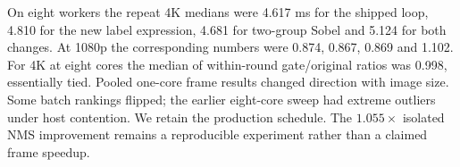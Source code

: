 On eight workers the repeat 4K medians were 4.617 ms for the shipped loop, 4.810 for the new label expression, 4.681 for two-group Sobel and 5.124 for both changes. At 1080p the corresponding numbers were 0.874, 0.867, 0.869 and 1.102. For 4K at eight cores the median of within-round gate/original ratios was 0.998, essentially tied. Pooled one-core frame results changed direction with image size. Some batch rankings flipped; the earlier eight-core sweep had extreme outliers under host contention. We retain the production schedule. The $1.055\times$ isolated NMS improvement remains a reproducible experiment rather than a claimed frame speedup.
